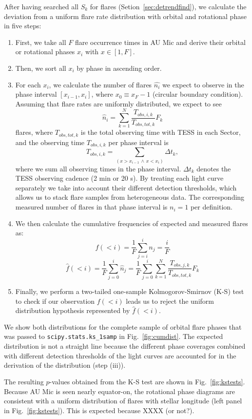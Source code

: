 \documentclass[fleqn,usenatbib,letters]{mnras}%
\begin{document}
After having searched all $S_k$ for flares (Setion~\ref{sec:detrendfind}), we calculate the deviation from a uniform flare rate distribution with orbital and rotational phase in five steps:
\begin{enumerate}
\item First, we take all $F$ flare occurrence times in AU Mic and derive their orbital or rotational phases $x_i$ with $x \in [1,F]$. 
\item Then, we sort all $x_i$ by phase in ascending order.
\item For each $x_i$, we calculate the number of flares $\hat{n_i}$ we expect to observe in the phase interval $[x_{i-1}, x_i]$, where $x_0\equiv x_F - 1$ (circular boundary condition). Assuming that flare rates are uniformly distributed, we expect to see
$$\hat{n}_i = \displaystyle\sum_{k=1}^N\dfrac{T_{obs, i, k}}{T_{obs, tot, k}} F_k$$
flares, where $T_{obs, tot, k}$ is the total observing time with TESS in each Sector, and the observing time $T_{obs,i,k}$ per phase interval is
$$T_{obs,i,k}=\displaystyle\sum_{(x>x_{i-1}\, \land \, x<x_i)} \Delta t_k,$$
where we sum all observing times in the phase interval. $\Delta t_k$ denotes the TESS observing cadence (2 min or 20 s). By treating each light curve separately we take into account their different detection thresholds, which allows us to stack flare samples from heterogeneous data. The corresponding measured number of flares in that phase interval is $n_i=1$ per definition.
\item We then calculate the cumulative frequencies of expected and measured flares as:
$$f(<i) = \dfrac{1}{F}\displaystyle\sum_{j=i}^{i}n_j= \dfrac{i}{F}$$
$$\hat{f}(<i) =  \dfrac{1}{F}\displaystyle\sum_{j=0}^{i}\hat{n}_j = \dfrac{1}{F}\displaystyle\sum_{j=0}^{i}\displaystyle\sum_{k=1}^N\dfrac{T_{obs, j, k}}{T_{obs, tot, k}} F_k$$
\item Finally, we perform a two-tailed one-sample Kolmogorov-Smirnov (K-S) test to check if our observation $f(<i)$ leads us to reject the uniform distribution hypothesis represented by $\hat{f}(<i)$.
\end{enumerate}
We show both distributions for the complete sample of orbital flare phases that was passed to \texttt{scipy.stats.ks\_1samp} in Fig.~\ref{fig:cumdist}. The expected distribution is not a straight line because the different phase coverages combined with different detection thresholds of the light curves are accounted for in the derivation of the distribution (step (iii)). 

The resulting $p$-values obtained from the K-S test are shown in Fig.~\ref{fig:kstests}. Because AU Mic is seen nearly equator-on, the rotational phase diagrams are consistent with a uniform distribution of flares with stellar longitude (left panel in Fig.~\ref{fig:kstests}). This is expected because XXXX (or not?).
\end{document}
